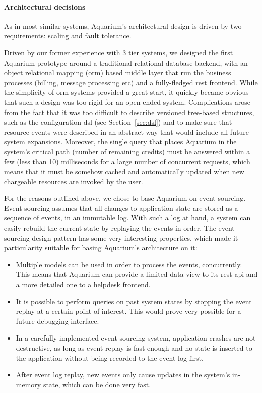\paragraph{Architectural decisions} As in most similar systems, Aquarium's
architectural design is driven by two requirements: scaling and fault
tolerance.

Driven by our former experience with 3 tier systems, we designed the first
Aquarium prototype around a traditional relational database backend, with an
object relational mapping ({\sc orm}) based middle layer that run the business
processes (billing, message processing etc) and a fully-fledged {\sc rest}
frontend. While the simplicity of {\sc orm} systems provided a great start,
it quickly became obvious that such a design was too rigid for an open 
ended system. Complications arose from the fact that it was too difficult
to describe versioned tree-based structures, such as the configuration {\sc dsl} 
(see Section~\ref{sec:dsl}) and to make sure that resource events were
described in an abstract way that would include all future system expansions.
Moreover, the single query that places Aquarium in the system's critical 
path (number of remaining credits) must be answered within a few (less than
10) milliseconds for a large number of concurrent requests, which means that
it must be somehow cached and automatically updated when new chargeable 
resources are invoked by the user.

For the reasons outlined above, we chose to base Aquarium on event sourcing. 
Event sourcing assumes that all changes to application
state are stored as a sequence of events, in an immutable log. With such a log
at hand, a system can easily rebuild the current state by replaying the events
in order. The event sourcing design pattern has some very interesting
properties, which made it particularity suitable for basing Aquarium's
architecture on it:

\begin{itemize}

    \item Multiple models can be used in order to process the events, 
        concurrently. This means that Aquarium can provide a limited
        data view to its {\sc rest api} and a more detailed one to a
        helpdesk frontend.

    \item It is possible to perform queries on past system states by stopping
        the event replay at a certain point of interest. This would prove very
        possible for a future debugging interface.

    \item In a carefully implemented event sourcing system, application crashes 
        are not destructive, as long as event replay is fast enough and no
        state is inserted to the application without being recorded to the event
        log first.

    \item After event log replay, new events only cause updates in the system's
        in-memory state, which can be done very fast.

\end{itemize}

